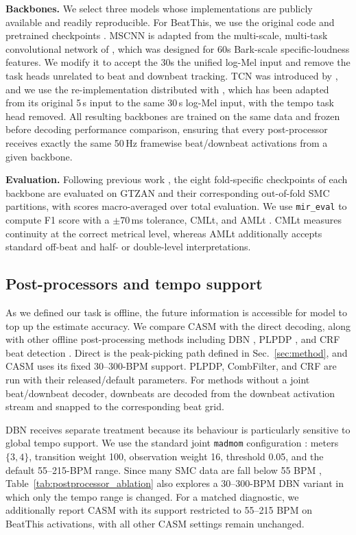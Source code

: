 \documentclass{article}
\begin{document}
\textbf{Backbones.} We select three models whose implementations are publicly available and readily reproducible. For BeatThis, we use the original code and pretrained checkpoints \cite{foscarin2024beat}. MSCNN is adapted from the multi-scale, multi-task convolutional network of \cite{he2026dynest}, which was designed for 60s Bark-scale specific-loudness features. We modify it to accept the 30s the unified log-Mel input and remove the task heads unrelated to beat and downbeat tracking. TCN was introduced by \cite{bock2020deconstruct}, and we use the re-implementation distributed with \cite{he2026dynest}, which has been adapted from its original 5\,s input to the same 30\,s log-Mel input, with the tempo task head removed. All resulting backbones are trained on the same data and frozen before decoding performance comparison, ensuring that every post-processor receives exactly the same 50\,Hz framewise beat/downbeat activations from a given backbone.

\textbf{Evaluation.} Following previous work \cite{foscarin2024beat}, the eight fold-specific checkpoints of each backbone are evaluated on GTZAN and their corresponding out-of-fold SMC partitions, with scores macro-averaged over total evaluation. We use \texttt{mir\_eval} to compute F1 score with a $\pm70$\,ms tolerance, CMLt, and AMLt \cite{raffel2014mireval}. CMLt measures continuity at the correct metrical level, whereas AMLt additionally accepts standard off-beat and half- or double-level interpretations.


\subsection{Post-processors and tempo support}
As we defined our task is offline, the future information is accessible for model to top up the estimate accuracy. We compare CASM with the direct decoding, along with other offline post-processing methods including DBN \cite{krebs2015dbn}, PLPDP \cite{chiu2023localperiodicity}, and CRF beat detection \cite{korzeniowski2014crf}. Direct is the peak-picking path defined in Sec.~\ref{sec:method}, and CASM uses its fixed 30--300-BPM support. PLPDP, CombFilter, and CRF are run with their released/default parameters. For methods without a joint beat/downbeat decoder, downbeats are decoded from the downbeat activation stream and snapped to the corresponding beat grid.

DBN receives separate treatment because its behaviour is particularly sensitive to global tempo support. We use the standard joint \texttt{madmom} configuration \cite{krebs2015dbn}: meters $\{3,4\}$, transition weight 100, observation weight 16, threshold 0.05, and the default 55--215-BPM range. Since many SMC data are fall below 55 BPM \cite{ahn2026smcblindspot}, Table~\ref{tab:postprocessor_ablation} also explores a 30--300-BPM DBN variant in which only the tempo range is changed. For a matched diagnostic, we additionally report CASM with its support restricted to 55--215 BPM on BeatThis activations, with all other CASM settings remain unchanged.
\end{document}
